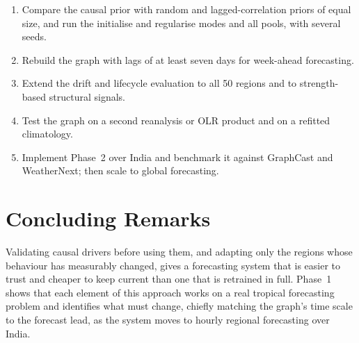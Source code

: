 \begin{enumerate}
  \item Compare the causal prior with random and lagged-correlation priors of equal size, and run the initialise and regularise modes and all pools, with several seeds.
  \item Rebuild the graph with lags of at least seven days for week-ahead forecasting.
  \item Extend the drift and lifecycle evaluation to all 50 regions and to strength-based structural signals.
  \item Test the graph on a second reanalysis or OLR product and on a refitted climatology.
  \item Implement Phase~2 over India and benchmark it against GraphCast and WeatherNext; then scale to global forecasting.
\end{enumerate}

\section{Concluding Remarks}
\label{sec:conc-final}

Validating causal drivers before using them, and adapting only the regions whose behaviour has measurably changed, gives a forecasting system that is easier to trust and cheaper to keep current than one that is retrained in full. Phase~1 shows that each element of this approach works on a real tropical forecasting problem and identifies what must change, chiefly matching the graph's time scale to the forecast lead, as the system moves to hourly regional forecasting over India.

